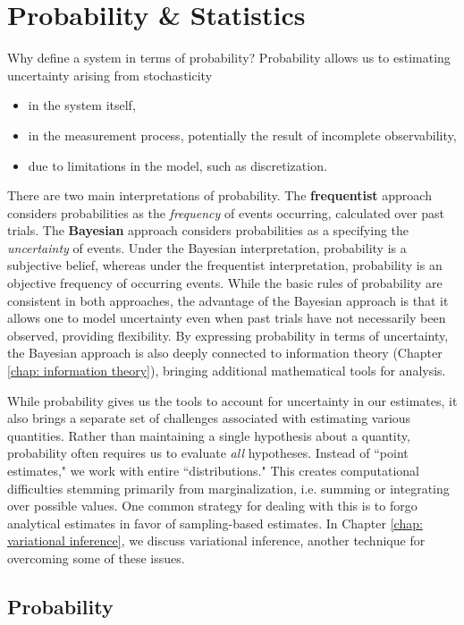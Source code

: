 \chapter{Probability \& Statistics}

Why define a system in terms of probability? Probability allows us to estimating uncertainty arising from stochasticity
\begin{itemize}
    \item in the system itself,
    \item in the measurement process, potentially the result of incomplete observability,
    \item due to limitations in the model, such as discretization.
\end{itemize}
There are two main interpretations of probability. The \textbf{frequentist} approach considers probabilities as the \textit{frequency} of events occurring, calculated over past trials. The \textbf{Bayesian} approach considers probabilities as a specifying the \textit{uncertainty} of events. Under the Bayesian interpretation, probability is a subjective belief, whereas under the frequentist interpretation, probability is an objective frequency of occurring events. While the basic rules of probability are consistent in both approaches, the advantage of the Bayesian approach is that it allows one to model uncertainty even when past trials have not necessarily been observed, providing flexibility. By expressing probability in terms of uncertainty, the Bayesian approach is also deeply connected to information theory (Chapter \ref{chap: information theory}), bringing additional mathematical tools for analysis. 

While probability gives us the tools to account for uncertainty in our estimates, it also brings a separate set of challenges associated with estimating various quantities. Rather than maintaining a single hypothesis about a quantity, probability often requires us to evaluate \textit{all} hypotheses. Instead of ``point estimates," we work with entire ``distributions." This creates computational difficulties stemming primarily from marginalization, i.e. summing or integrating over possible values. One common strategy for dealing with this is to forgo analytical estimates in favor of sampling-based estimates. In Chapter \ref{chap: variational inference}, we discuss variational inference, another technique for overcoming some of these issues.


\section{Probability}

